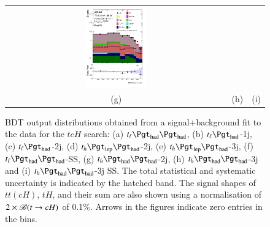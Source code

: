 \begin{figure}[H]
\begin{tabular}{@{}ccc@{}}
\includegraphics[width=0.29\textwidth]{figures/BDT/tcH_reg2mtau1b3jss.pdf}\\
(g) & (h)  & (i) \\
\end{tabular}
\caption{ BDT output distributions obtained from a signal+background fit to the data for the $tcH$ search: 
(a) $t_{\ell}\thadhad$, (b) $t_{\ell}\tauhad$-1j,  (c) $t_{\ell}\tauhad$-2j, (d) $t_h\tlhad$-2j, (e) $t_h\tlhad$-3j, (f) $t_{\ell}\thadhad$-SS, (g) $t_h\thadhad$-2j, (h) $t_h\thadhad$-3j and (i) $t_h\thadhad$-3j SS. 
The total statistical and systematic
uncertainty is indicated by the hatched band. The signal shapes of $tt(cH)$, $tH$, and their sum are also shown using a normalisation of $2 \times\mathscr{B}(t\rightarrow cH)$ of 0.1\%. Arrows in the figures indicate zero entries in the bins.
}
\label{fig:asimov_postfitbdtHc}
\end{figure}






